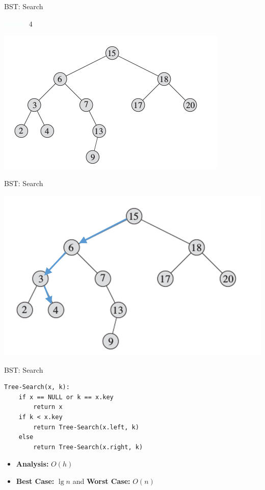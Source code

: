 \documentclass{beamer}
\newcommand{\tblue}[1]{{\Large {\textcolor{azure}{#1}}}}
\begin{document}
\begin{frame}{BST: Search}

\tblue{Search:} $4$
    \begin{center}
        \includegraphics[scale=0.7]{bstSearch.png}
    \end{center}
\end{frame}


\begin{frame}{BST: Search}
    \begin{center}
        \includegraphics[scale=0.5]{bstSearch2.png}
    \end{center}
\end{frame}

\begin{frame}[fragile]{BST: Search}
    \begin{verbatim}
Tree-Search(x, k):
    if x == NULL or k == x.key
        return x
    if k < x.key
        return Tree-Search(x.left, k)
    else
        return Tree-Search(x.right, k)
    \end{verbatim}
    \begin{itemize}
        \item {\bf Analysis:} \pause $O(h)$
        \item {\bf Best Case:} $\lg n$ and {\bf Worst Case:} $O(n)$
    \end{itemize}
\end{frame}
\end{document}

